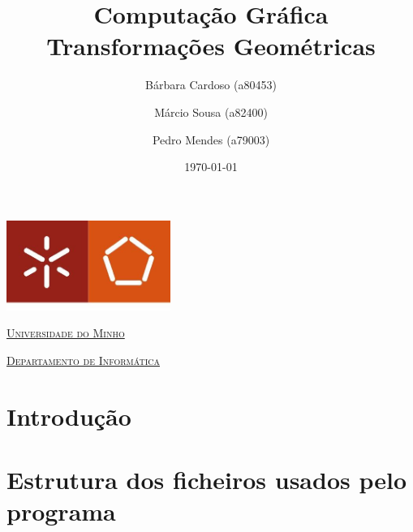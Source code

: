 \documentclass[a4paper]{article}
\begin{document}
\title{Computação Gráfica\\ Transformações Geométricas}
\author{Bárbara Cardoso (a80453) \and Márcio Sousa (a82400) \and Pedro Mendes (a79003)}
\date{\today}

\begin{titlepage}

    \thispagestyle{empty}
    \begin{center}
        \begin{minipage}{0.75\linewidth}
            \centering
            \includegraphics[width=0.4\textwidth]{eng.jpeg}\par\vspace{1cm}
            \vspace{1.5cm}
            \href{https://www.uminho.pt/PT}{\scshape\LARGE Universidade do Minho} \par
            \vspace{1cm}
            \href{https://www.di.uminho.pt/}{\scshape\Large Departamento de Informática} \par
            \vspace{1.5cm}

            \maketitle
        \end{minipage}
    \end{center}

\end{titlepage}

\tableofcontents

\pagebreak

\section{Introdução}

\section{Estrutura dos ficheiros usados pelo programa}\label{sec:estrutura-ficheiros}
\end{document}
